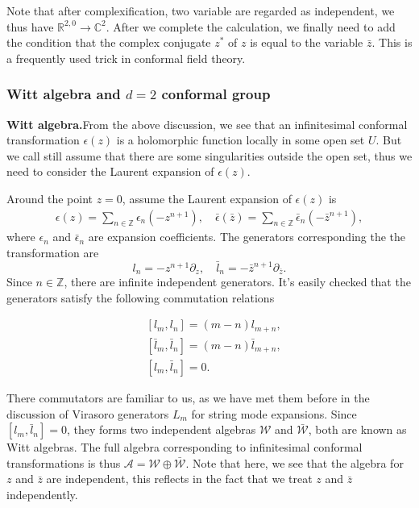 \documentclass[graybox,envcountchap,sectrefs]{svmono}
\begin{document}
Note that after complexification, two variable are regarded as independent, we thus have $\mathbb{R}^{2,0}\to \mathbb{C}^2$. 
After we complete the calculation, we finally need to add the condition that the complex conjugate $z^*$ of $z$ is equal to the variable $\bar{z}$. This is a frequently used trick in conformal field theory.


\subsubsection{Witt algebra and $d=2$ conformal group}
\textbf{Witt algebra.}\textemdash From the above discussion, we see that an infinitesimal conformal transformation $\epsilon(z)$ is a holomorphic function locally in some open set $U$. But we call still assume that  there are some singularities outside the open set, thus we need to consider the Laurent expansion of $\epsilon(z)$.

Around the point $z=0$, assume the Laurent expansion of $\epsilon(z)$ is
\begin{align}
\epsilon(z)=\sum_{n\in\mathbb{Z}}\epsilon_n (-z^{n+1}),\quad \bar{\epsilon}(\bar{z})=\sum_{n\in\mathbb{Z}}\bar{\epsilon}_n (-\bar{z}^{n+1}),
\end{align}
where $\epsilon_n$ and $\bar{\epsilon}_n$ are expansion coefficients. The generators corresponding the the transformation are
\begin{equation}
\boxed{ 
l_n=-z^{n+1}\partial_z,\quad \bar{l}_n=-\bar{z}^{n+1}\partial_{\bar{z}}.
}
\end{equation}
Since $n\in \mathbb{Z}$, there are infinite independent generators. It's easily checked that the generators satisfy the following commutation relations
\begin{svgraybox}
\begin{align}
&[l_m,l_n]=(m-n)l_{m+n},\\
&[\bar{l}_m,\bar{l}_n]=(m-n)\bar{l}_{m+n},\\
&[l_m,\bar{l}_n]=0.
\end{align}
\end{svgraybox}
There commutators are familiar to us, as we have met them before  in the discussion of Virasoro generators $L_m$ for string mode expansions. Since $[l_m,\bar{l}_n]=0$, they forms two independent algebras $\mathcal{W}$ and $\bar{\mathcal{W}}$, both are known as Witt algebras. The full algebra corresponding to infinitesimal conformal transformations is thus $\mathcal{A}=\mathcal{W}\oplus \bar{\mathcal{W}}$. Note that here, we see that the algebra for $z$ and $\bar{z}$ are independent, this reflects in the fact that we treat $z$ and $\bar{z}$ independently.
\end{document}
